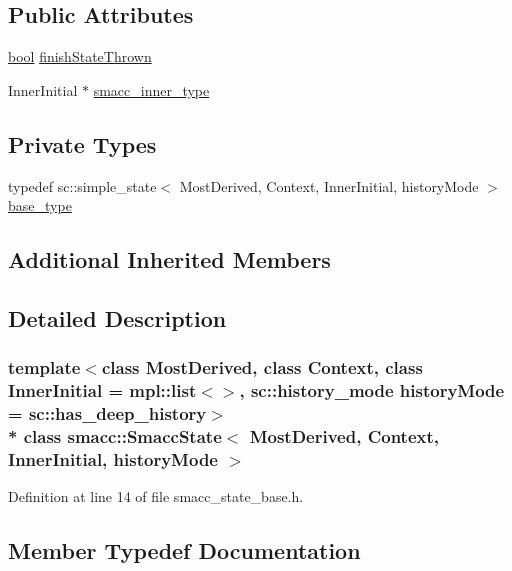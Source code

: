 \subsection*{Public Attributes}
\begin{DoxyCompactItemize}
\item 
\hyperlink{classbool}{bool} \hyperlink{classsmacc_1_1SmaccState_a6c40f733c35ddfb9ae2a2f8e9bab07d3}{finish\+State\+Thrown}
\item 
Inner\+Initial $\ast$ \hyperlink{classsmacc_1_1SmaccState_a087d0f66729b98614feb8c59ea548af1}{smacc\+\_\+inner\+\_\+type}
\end{DoxyCompactItemize}
\subsection*{Private Types}
\begin{DoxyCompactItemize}
\item 
typedef sc\+::simple\+\_\+state$<$ Most\+Derived, Context, Inner\+Initial, history\+Mode $>$ \hyperlink{classsmacc_1_1SmaccState_a68f547c6fe147554bbe607b6fcd8e40a}{base\+\_\+type}
\end{DoxyCompactItemize}
\subsection*{Additional Inherited Members}


\subsection{Detailed Description}
\subsubsection*{template$<$class Most\+Derived, class Context, class Inner\+Initial = mpl\+::list$<$$>$, sc\+::history\+\_\+mode history\+Mode = sc\+::has\+\_\+deep\+\_\+history$>$\\*
class smacc\+::\+Smacc\+State$<$ Most\+Derived, Context, Inner\+Initial, history\+Mode $>$}



Definition at line 14 of file smacc\+\_\+state\+\_\+base.\+h.



\subsection{Member Typedef Documentation}

